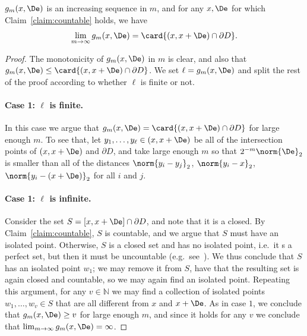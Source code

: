     \begin{claim}\label{claim:converge}
      $g_{m}(x,\De)$ is an increasing sequence in $m$, and for any $x,\De$ for which Claim~\ref{claim:countable} holds, we have
      \[
      \lim_{m\rightarrow \infty} g_{m}(x,\De) = \card{(x,x+\De)\cap \partial D}.
      \]
    \end{claim}
    \begin{proof}
      The monotonicity of $g_m(x,\De)$ in $m$ is clear, and also that
      $g_{m}(x,\De)\leq \card{(x,x+\De)\cap \partial D}$. We set
      $\ell = g_{m}(x,\De)$ and split the rest of the proof according to
      whether $\ell$ is finite or not.

      \paragraph{Case 1: $\ell$ is finite.}
      In this case we argue that $g_{m}(x,\De) = \card{(x,x+\De)\cap \partial D}$
      for large enough $m$.  To see that, let $y_1,\ldots,y_\ell\in (x,x+\De)$ be all of the intersection
      points of $(x,x+\De)$ and $\partial D$, and take large enough $m$
      so that $2^{-m}\norm{\De}_2$ is smaller than all of the distances $\norm{y_i-y_j}_2$,
      $\norm{y_i-x}_2$, $\norm{y_i - (x + \De)}_2$ for all $i$ and $j$.

      \paragraph{Case 1: $\ell$ is infinite.}
      Consider the set $S = [x,x+\De]\cap \partial D$, and note that it is a closed.
      By Claim~\ref{claim:countable}, $S$ is countable, and we argue that $S$ must have an
      isolated point. Otherwise, $S$ is a closed set and has no isolated point, i.e.\
      it s a perfect set, but then it must be uncountable (e.g.\ see~\cite{perfect}).
      We thus conclude that $S$ has an isolated point $w_1$; we may remove it from
      $S$, have that the resulting set is again closed and countable, so we may again find
      an isolated point. Repeating this argument, for any $v\in\mathbb{N}$ we may find
      a collection of isolated points $w_1,\ldots,w_v\in S$ that are all different from
      $x$ and $x+\De$. As in case $1$, we conclude that $g_m(x,\De) \geq v$
      for large enough $m$, and since it holds for any $v$ we conclude that $\lim_{m\rightarrow \infty} g_m(x,\De) = \infty$.
    \end{proof}

